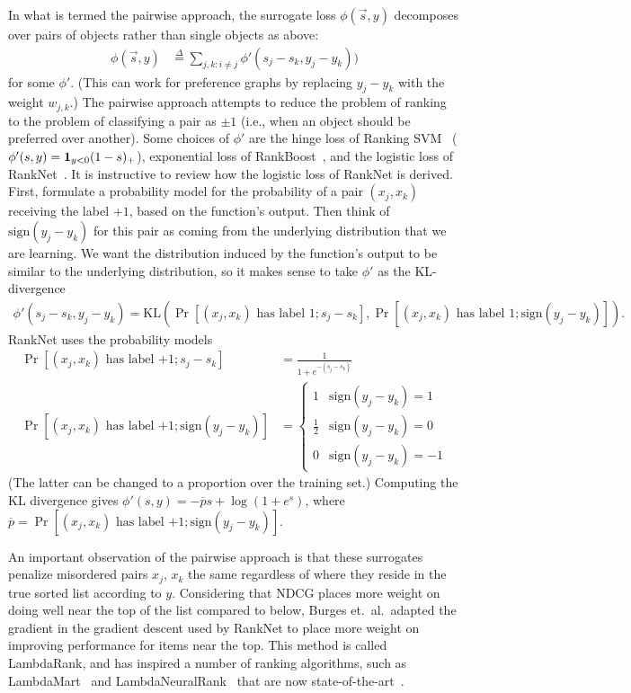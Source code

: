 In what is termed the pairwise approach, the surrogate loss
$\phi(\vec{s}, y)$ decomposes over pairs of objects rather than single objects
as above:
\begin{align*}
  \phi(\vec{s}, y)
  &\stackrel{\Delta}{=}
  \sum_{j,k : i \neq j} \phi'(s_j - s_k, y_j - y_k))
\end{align*}
for some $\phi'$. (This can work for preference graphs by replacing $y_j - y_k$
with the weight $w_{j,k}$.)
The pairwise approach attempts to reduce the problem of
ranking to the problem of classifying a pair as $\pm 1$ (i.e.,
when an object should be preferred over another). Some choices of $\phi'$
are the hinge loss of Ranking SVM~\cite{Herbrich99rankingsvm}
($\phi'(s, y) = {\mathbf 1}_{y < 0}(1 - s)_+$),
exponential loss of RankBoost~\cite{Freund98rankboost},
and the logistic loss of RankNet~\cite{Burges05ranknet}.
It is instructive to review how the logistic loss of RankNet is derived.
First, formulate a probability model for the probability
of a pair $(x_j, x_k)$ receiving the label $+1$, based on the function's
output. Then think of $\text{sign}(y_j - y_k)$
for this pair as coming from the underlying distribution that we are learning.
We want the distribution induced by the function's output to be similar to the
underlying distribution, so it makes sense to take $\phi'$ as the KL-divergence
\begin{align*}
  \phi'(s_j - s_k, y_j - y_k)
  = \text{KL}(\Pr[\text{$(x_j, x_k)$ has label $1$} ; s_j - s_k], \Pr[\text{$(x_j, x_k)$ has label $1$} ; \text{sign}(y_j - y_k)]).
\end{align*}
RankNet uses the probability models
\begin{align*}
  \Pr[\text{$(x_j, x_k)$ has label $+1$}; s_j - s_k] &= \frac{1}{1 + e^{-(s_j - s_k)}} \\
  \Pr[\text{$(x_j, x_k)$ has label $+1$} ; \text{sign}(y_j - y_k)] &=
  \begin{cases}
    1 & \text{sign}(y_j - y_k) = 1 \\
    \frac{1}{2} & \text{sign}(y_j - y_k) = 0 \\
    0 & \text{sign}(y_j - y_k) = -1
  \end{cases}
\end{align*}
(The latter can be changed to a proportion over the training set.)
Computing the KL divergence gives $\phi'(s, y) = -\overline{p} s + \log(1 + e^s)$,
where
$\overline{p} = \Pr[\text{$(x_j, x_k)$ has label $+1$} ; \text{sign}(y_j - y_k)]$. 

An important observation of the pairwise approach is that these surrogates
penalize misordered pairs $x_j$, $x_k$ the same regardless of where they
reside in the true sorted list according to $y$. 
Considering that NDCG places more weight on doing well near the top of the list
compared to below, Burges et.\ al.\ adapted the gradient in the gradient descent
used by RankNet to place more weight on improving performance for items near
the top. This method is called LambdaRank, and has inspired a number of
ranking algorithms, such as LambdaMart~\cite{Burges2010ranknetlambdamart} and
LambdaNeuralRank~\cite{papini2012neuralrank}
that are now state-of-the-art~\cite{tax2015benchmark}.

